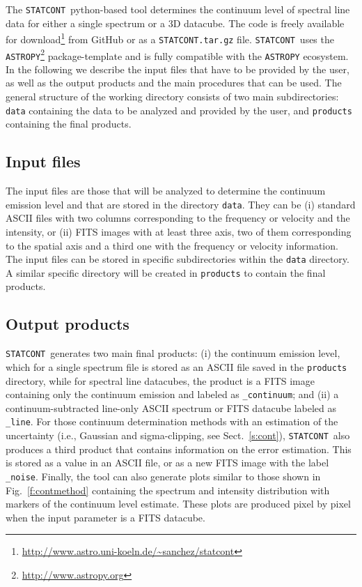 \documentclass{aa}
\newcommand{\statcont} {\texttt{STATCONT}}
\begin{document}
The \statcont\ python-based tool determines the continuum level of spectral line data for either a single spectrum or a 3D datacube. The code is freely available for download\footnote{\url{http://www.astro.uni-koeln.de/~sanchez/statcont}} from GitHub or as a \texttt{STATCONT.tar.gz} file. \statcont\ uses the \texttt{ASTROPY}\footnote{\url{http://www.astropy.org}} package-template and is fully compatible with the \texttt{ASTROPY} ecosystem. In the following we describe the input files that have to be provided by the user, as well as the output products and the main procedures that can be used. The general structure of the working directory consists of two main subdirectories: \texttt{data} containing the data to be analyzed and provided by the user, and \texttt{products} containing the final products.

\subsection{Input files}\label{s:input}

The input files are those that will be analyzed to determine the continuum emission level and that are stored in the directory \texttt{data}. They can be (i) standard ASCII files with two columns corresponding to the frequency or velocity and the intensity, or (ii) FITS images with at least three axis, two of them corresponding to the spatial axis and a third one with the frequency or velocity information. The input files can be stored in specific subdirectories within the \texttt{data} directory. A similar specific directory will be created in \texttt{products} to contain the final products. 

\subsection{Output products}\label{s:products}

\statcont\ generates two main final products: (i) the continuum emission level, which for a single spectrum file is stored as an ASCII file saved in the \texttt{products} directory, while for spectral line datacubes, the product is a FITS image containing only the continuum emission and labeled as \texttt{\_continuum}; and (ii) a continuum-subtracted line-only ASCII spectrum or FITS datacube labeled as \texttt{\_line}. For those continuum determination methods with an estimation of the uncertainty (i.e., Gaussian and sigma-clipping, see Sect.~\ref{s:cont}), \statcont\ also produces a third product that contains information on the error estimation. This is stored as a value in an ASCII file, or as a new FITS image with the label \texttt{\_noise}. Finally, the tool can also generate plots similar to those shown in Fig.~\ref{f:contmethod} containing the spectrum and intensity distribution with markers of the continuum level estimate. These plots are produced pixel by pixel when the input parameter is a FITS datacube.
\end{document}
